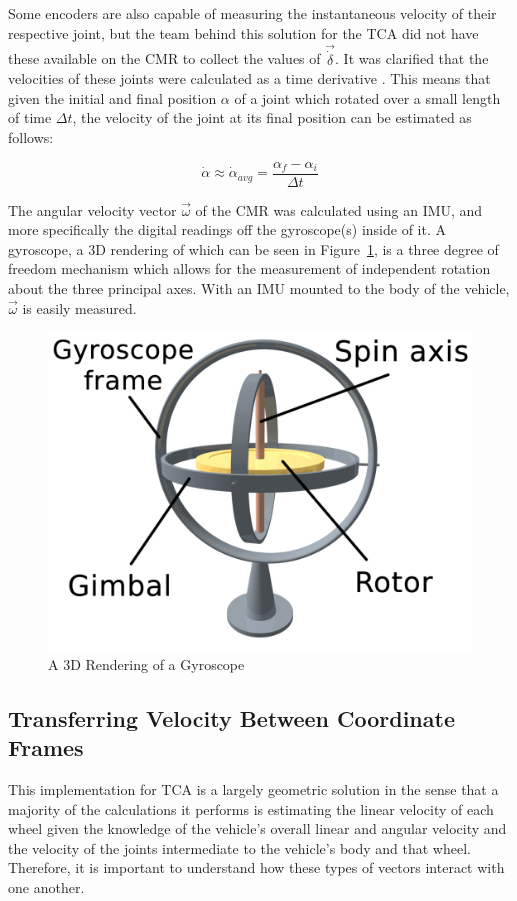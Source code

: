 Some encoders are also capable of measuring the instantaneous velocity of their respective joint, but the team behind this solution for the \ac{TCA} did not have these available on the \ac{CMR} to collect the values of $\vec{\dot{\delta}}$. It was clarified that the velocities of these joints were calculated as a time derivative \cite{tractl}. This means that given the initial and final position $\alpha$ of a joint which rotated over a small length of time $\Delta t$, the velocity of the joint at its final position can be estimated as follows:

\begin{equation}
	\dot{\alpha} \approx \dot{\alpha}_{avg} = \frac{\alpha_{f} - \alpha_{i}}{\Delta t}
\end{equation}

The angular velocity vector $\vec{\omega}$ of the \ac{CMR} was calculated using an \ac{IMU}, and more specifically the digital readings off the gyroscope(s) inside of it. A gyroscope, a 3D rendering of which can be seen in Figure~\ref{traction_control:algorithms:gyro}, is a three degree of freedom mechanism which allows for the measurement of independent rotation about the three principal axes. With an \ac{IMU} mounted to the body of the vehicle, $\vec{\omega}$ is easily measured.

\begin{figure}[htbp]
	\centering
	\includegraphics[width=.5\textwidth]{sections/algorithms/images/gyroscope.png}
	\caption{A 3D Rendering of a Gyroscope}
	\label{traction_control:algorithms:gyro}
\end{figure}

\subsection{Transferring Velocity Between Coordinate Frames}
This implementation for \ac{TCA} is a largely geometric solution in the sense that a majority of the calculations it performs is estimating the linear velocity of each wheel given the knowledge of the vehicle's overall linear and angular velocity and the velocity of the joints intermediate to the vehicle's body and that wheel. Therefore, it is important to understand how these types of vectors interact with one another. \\


